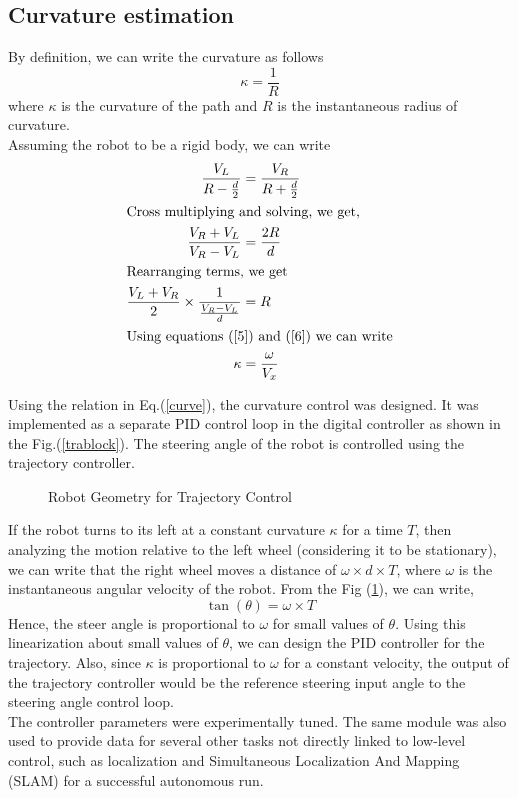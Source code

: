 \documentclass[conference]{IEEEtran}
\begin{document}
\subsection{Curvature estimation}
By definition, we can write the curvature as follows
\begin{equation}
\kappa=\frac 1 R
\end{equation}
where $\kappa$ is the curvature of the path and $R$ is the instantaneous radius of curvature. \\
Assuming the robot to be a rigid body, we can write
\begin{align}
\frac {V_{L}} {R-\frac d 2} &= \frac {V_{R}} {R+\frac d 2}\\
\intertext{Cross multiplying and solving, we get,}
\frac {V_{R}+V_{L}} {V_{R}-V_{L}} &= \frac {2R} {d}\\
\intertext{Rearranging terms, we get}
\frac {V_{L}+V_{R}}{2} \times \frac{1}{\frac{V_{R}-V_{L}}{d} } &= R\\
\intertext{Using equations (\ref{5}) and (\ref{6}) we can write}
\label{curve}
\kappa &= \frac{\omega}{V_{x}}
\end{align}

Using the relation in Eq.(\ref{curve}), the curvature control was designed. It was implemented as a separate PID control loop in the digital controller as shown in the Fig.(\ref{trablock}). The steering angle of the robot is controlled using the trajectory controller. \\
\begin{figure}[htbp]

			  \centering
%			  
			  \def\svgscale{0.25}
			  \tiny{
			  }
			  \caption{Robot Geometry for Trajectory Control}
			 \label{figuretrig}
		\end{figure}
If the robot turns to its left at a constant curvature $\kappa$ for a time $T$, then analyzing the motion relative to the left wheel (considering it to be stationary), we can write that the right wheel moves a distance of $\omega \times d \times T$, where $\omega$ is the instantaneous angular velocity of the robot. From the Fig (\ref{figuretrig}), we can write,
\begin{equation}
\tan(\theta)= \omega \times T
\end{equation}
Hence, the steer angle is proportional to $\omega$ for small values of $\theta$. Using this linearization about small values of $\theta$, we can design the PID controller for the trajectory. Also, since $\kappa$ is proportional to $\omega$ for a constant velocity, the output of the trajectory controller would be the reference steering input angle to the steering angle control loop.\\
The controller parameters were experimentally tuned. The same module was also used to provide data for several other tasks not directly linked to low-level control, such as localization and Simultaneous Localization And Mapping (SLAM) for a successful autonomous run.
\end{document}
